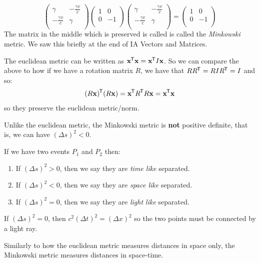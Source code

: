 \documentclass[../main.tex]{subfiles}
\begin{document}
\[
  \begin{pmatrix}
  \gamma & - \frac{\gamma v}{c} \\
  - \frac{\gamma v}{c} & \gamma \\
  \end{pmatrix} \begin{pmatrix}
  1 & 0 \\
  0 & -1 \\
  \end{pmatrix}\begin{pmatrix}
  \gamma & - \frac{\gamma v}{c} \\
  - \frac{\gamma v}{c} & \gamma \\
  \end{pmatrix} = \begin{pmatrix}
  1 & 0 \\
  0 & -1 \\
  \end{pmatrix}
\]
The matrix in the middle which is preserved is called  is called the \textit{Minkowski} metric.
We saw this briefly at the end of IA Vectors and Matrices.
\begin{remark}
  The euclidean metric can be written as $\mathbf{\bm{x}}^{{\mkern-1.5mu\mathsf{T}}} \mathbf{\bm{x}} = \mathbf{\bm{x}}^{{\mkern-1.5mu\mathsf{T}}} I \mathbf{\bm{x}}$.
  So we can compare the above to how if we have a rotation matrix $R$, we have that $R R^{{\mkern-1.5mu\mathsf{T}}} = R I R^{{\mkern-1.5mu\mathsf{T}}} = I$ and so:
  \[
    (R\mathbf{\bm{x}})^{{\mkern-1.5mu\mathsf{T}}}(R\mathbf{\bm{x}}) = \mathbf{\bm{x}}^{{\mkern-1.5mu\mathsf{T}}} R^{{\mkern-1.5mu\mathsf{T}}} R \mathbf{\bm{x}} = \mathbf{\bm{x}}^{{\mkern-1.5mu\mathsf{T}}} \mathbf{\bm{x}}
  \]
  so they preserve the euclidean metric/norm.
\end{remark}
\begin{remark}[Warning]
  Unlike the euclidean metric, the Minkowski metric is \textbf{not} positive definite, that is, we can have $(\Delta s)^2 < 0$.
\end{remark}
\begin{definition}
  If we have two events $P_1$ and $P_2$ then:
  \begin{enumerate}
    \item If $(\Delta s)^2 > 0$, then we say they are \textit{time like} separated.
    \item If $(\Delta s)^2 < 0$, then we say they are \textit{space like} separated.
    \item If $(\Delta s)^2 = 0$, then we say they are \textit{light like} separated.
  \end{enumerate}
\end{definition}
\begin{remark}
  If $(\Delta s)^2 = 0$, then $c^2(\Delta t)^2 = (\Delta x)^2$ so the two points must be connected by a light ray.
\end{remark}
Similarly to how the euclidean metric measures distances in space only, the Minkowski metric measures distances in space-time.
\end{document}
